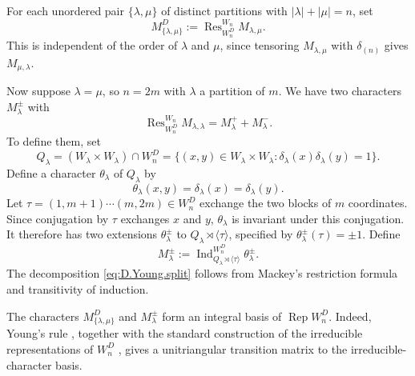 \documentclass[11pt]{amsart}
\numberwithin{equation}{section}
\theoremstyle{definition}
\def\beq{\begin{equation}}
\def\eeq{\end{equation}}
\DeclareMathOperator{\Rep}{\mathrm{Rep}}
\DeclareMathOperator{\Ind}{\mathrm{Ind}}
\DeclareMathOperator{\Res}{\mathrm{Res}}
\begin{document}
For each unordered pair $\{\lambda,\mu\}$ of distinct partitions with $|\lambda|+|\mu|=n$, set
\[
M^D_{\{\lambda,\mu\}}
:=
\Res_{W_n^D}^{W_n}M_{\lambda,\mu}.
\]
This is independent of the order of $\lambda$ and $\mu$, since tensoring $M_{\lambda,\mu}$ with $\delta_{(n)}$ gives $M_{\mu,\lambda}$.


Now suppose  $\lambda=\mu$, so $n=2m$ with $\lambda$ a partition of $m$.
We have two characters $M_\lambda^\pm$ with
\beq\label{eq:D.Young.split}
\Res_{W_n^D}^{W_n}M_{\lambda,\lambda}
=
M_\lambda^++M_\lambda^-.
\eeq
To define them, set
\[
Q_\lambda
=(W_\lambda\times W_\lambda)\cap W_n^D
=\{(x,y)\in W_\lambda\times W_\lambda:
\delta_\lambda(x)\delta_\lambda(y)=1\}.
\]
Define a character $\theta_\lambda$ of $Q_\lambda$ by
\[
\theta_\lambda(x,y)=\delta_\lambda(x)=\delta_\lambda(y).
\]
Let $\tau=(1,m+1)\cdots(m,2m)\in W_n^D$ exchange the two blocks of $m$ coordinates.
Since conjugation by $\tau$ exchanges $x$ and $y$, $\theta_\lambda$ is invariant under this conjugation.
It therefore has two extensions $\theta_\lambda^\pm$ to $Q_\lambda\rtimes\langle\tau\rangle$, specified by $\theta_\lambda^\pm(\tau)=\pm1$.
Define
\[
M_\lambda^\pm
:=
\Ind_{Q_\lambda\rtimes\langle\tau\rangle}^{W_n^D}
\theta_\lambda^\pm.
\]
The decomposition \eqref{eq:D.Young.split} follows from Mackey's restriction formula \cite[Section~7.3, Proposition~22]{SerreReps} and transitivity of induction.

The characters $M^D_{\{\lambda,\mu\}}$ and $M_\lambda^\pm$ form an integral basis of $\Rep W_n^D$. 
Indeed, Young's rule \cite[Theorem~2.11.2]{Sagan}, together with the standard construction of the irreducible representations of $W_n^D$ \cite[Sections~5.5--5.6]{GP}, gives a unitriangular transition matrix to the irreducible-character basis.
\end{document}
